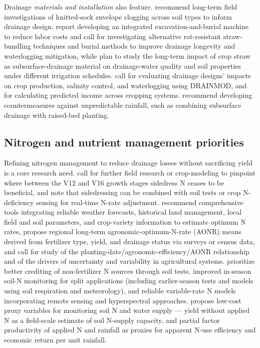Drainage \emph{materials and installation} also feature. \textcite{Ghane2022} recommend long-term field investigations of knitted-sock envelope clogging across soil types to inform drainage design. \textcite{Qi2025b} report developing an integrated excavation-and-burial machine to reduce labor costs and call for investigating alternative rot-resistant straw-bundling techniques and burial methods to improve drainage longevity and waterlogging mitigation, while \textcite{Lu2018} plan to study the long-term impact of crop straw as subsurface-drainage material on drainage-water quality and soil properties under different irrigation schedules. \textcite{Ellafi2021} call for evaluating drainage designs' impacts on crop production, salinity control, and waterlogging using DRAINMOD, and for calculating predicted income across cropping systems. \textcite{Takeshima2023} recommend developing countermeasures against unpredictable rainfall, such as combining subsurface drainage with raised-bed planting.

\subsection{Nitrogen and nutrient management priorities}

Refining nitrogen management to reduce drainage losses without sacrificing yield is a core research need. \textcite{Jaynes2013} call for further field research or crop-modeling to pinpoint where between the V12 and V16 growth stages sidedress N ceases to be beneficial, and \textcite{Jaynes2015} note that sidedressing can be combined with soil tests or crop N-deficiency sensing for real-time N-rate adjustment. \textcite{Maas2022} recommend comprehensive tools integrating reliable weather forecasts, historical land management, local field and soil parameters, and crop-variety information to estimate optimum N rates, propose regional long-term agronomic-optimum-N-rate (AONR) means derived from fertilizer type, yield, and drainage status via surveys or census data, and call for study of the planting-date/agronomic-efficiency/AONR relationship and of the drivers of uncertainty and variability in agricultural systems. \textcite{Dinnes2002} prioritize better crediting of non-fertilizer N sources through soil tests, improved in-season soil-N monitoring for split applications (including earlier-season tests and models using soil respiration and meteorology), and reliable variable-rate N models incorporating remote sensing and hyperspectral approaches. \textcite{Cassman2025} propose low-cost proxy variables for monitoring soil N and water supply --- yield without applied N as a field-scale estimate of soil N-supply capacity, and partial factor productivity of applied N and rainfall as proxies for apparent N-use efficiency and economic return per unit rainfall.

